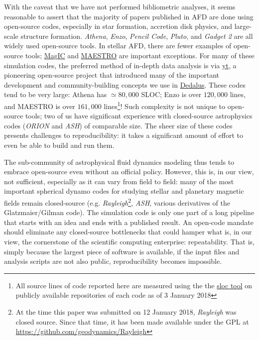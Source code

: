 \documentclass[12pt, titlepage]{aastex62}
\newcommand{\dedalus}{\href{http://dedalus-project.org}{Dedalus}}
\begin{document}
With the caveat that we have not performed bibliometric analyses, it seems reasonable to assert that the majority of papers published in AFD are done using open-source codes, especially in star formation, accretion disk physics, and large-scale structure formation. \emph{Athena}, \emph{Enzo}, \emph{Pencil Code}, \emph{Pluto}, and \emph{Gadget 2} are all widely used open-source tools. In stellar AFD, there are fewer examples of open-source tools; \href{http://magic-sph.github.io}{MagIC} and \href{http://amrex-astro.github.io/MAESTRO/}{MAESTRO} are important exceptions. For many of these simulation codes, the preferred method of in-depth data analysis is via \href{http://yt-project.org}{yt}, a pioneering open-source project that introduced many of the important development and community-building concepts we use in \dedalus{}. These codes tend to be very large: Athena has $\simeq 80,000$ SLOC; Enzo is over $120,000$ lines, and MAESTRO is over $161,000$ lines\footnote{All source lines of code reported here are measured using the the \href{https://github.com/bytbox/sloc}{sloc tool} on publicly available repositories of each code as of 3 January 2018}! Such complexity is not unique to open-source tools; two of us have significant experience with closed-source astrophysics codes (\emph{ORION} and \emph{ASH}) of comparable size. The sheer size of these codes presents challenges to reproducibility: it takes a significant amount of effort to even be able to build and run them. 

The sub-community of astrophysical fluid dynamics modeling thus tends to embrace open-source even without an official policy. However, this is, in our view, not sufficient, especially as it can vary from field to field: many of the most important spherical dynamo codes for studying stellar and planetary magnetic fields remain closed-source (e.g. \emph{Rayleigh}\footnote{At the time this paper was submitted on 12 January 2018, \emph{Rayleigh} was closed source. Since that time, it has been made available under the GPL at \url{https://github.com/geodynamics/Rayleigh}}, \emph{ASH}, various derivatives of the Glatzmaier/Gilman code). The simulation code is only one part of a long pipeline that starts with an idea and ends with a published result. An open-code mandate should eliminate any closed-source bottlenecks that could hamper what is, in our view, the cornerstone of the scientific computing enterprise: repeatability. That is, simply because the largest piece of software is available, if the input files and analysis scripts are not also public, reproducibility becomes impossible. 
\end{document}
